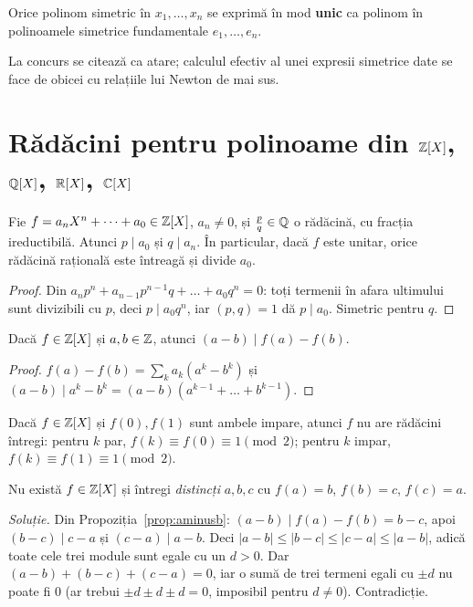 \begin{teorema}\label{teo:polsim}
Orice polinom simetric în $x_1,\dots,x_n$ se exprimă în mod \textbf{unic} ca polinom în polinoamele simetrice fundamentale $e_1,\dots,e_n$.
\end{teorema}

La concurs se citează ca atare; calculul efectiv al unei expresii simetrice date se face de obicei cu relațiile lui Newton de mai sus.

\section{Rădăcini pentru polinoame din $\mathbb{Z}[X]$, $\mathbb{Q}[X]$, $\mathbb{R}[X]$, $\mathbb{C}[X]$}

\begin{teorema}\label{teo:rationale}
Fie $f=a_nX^n+\dots+a_0\in\mathbb{Z}[X]$, $a_n\neq 0$, și $\frac pq\in\mathbb{Q}$ o rădăcină, cu fracția ireductibilă. Atunci $p\mid a_0$ și $q\mid a_n$. În particular, dacă $f$ este unitar, orice rădăcină rațională este întreagă și divide $a_0$.
\end{teorema}

\begin{proof}
Din $a_np^n+a_{n-1}p^{n-1}q+\dots+a_0q^n=0$: toți termenii în afara ultimului sunt divizibili cu $p$, deci $p\mid a_0q^n$, iar $(p,q)=1$ dă $p\mid a_0$. Simetric pentru $q$.
\end{proof}

\begin{propozitie}\label{prop:aminusb}
Dacă $f\in\mathbb{Z}[X]$ și $a,b\in\mathbb{Z}$, atunci $(a-b)\mid f(a)-f(b)$.
\end{propozitie}

\begin{proof}
$f(a)-f(b)=\sum_k a_k(a^k-b^k)$ și $(a-b)\mid a^k-b^k=(a-b)(a^{k-1}+\dots+b^{k-1})$.
\end{proof}

\begin{observatie}
Dacă $f\in\mathbb{Z}[X]$ și $f(0),f(1)$ sunt ambele impare, atunci $f$ nu are rădăcini întregi: pentru $k$ par, $f(k)\equiv f(0)\equiv1\pmod2$; pentru $k$ impar, $f(k)\equiv f(1)\equiv1\pmod 2$.
\end{observatie}

\begin{aplicatie}\label{apl:ciclu}
Nu există $f\in\mathbb{Z}[X]$ și întregi \emph{distincți} $a,b,c$ cu $f(a)=b$, $f(b)=c$, $f(c)=a$.

\emph{Soluție.} Din Propoziția~\ref{prop:aminusb}: $(a-b)\mid f(a)-f(b)=b-c$, apoi $(b-c)\mid c-a$ și $(c-a)\mid a-b$. Deci $|a-b|\le|b-c|\le|c-a|\le|a-b|$, adică toate cele trei module sunt egale cu un $d>0$. Dar $(a-b)+(b-c)+(c-a)=0$, iar o sumă de trei termeni egali cu $\pm d$ nu poate fi $0$ (ar trebui $\pm d\pm d\pm d=0$, imposibil pentru $d\neq0$). Contradicție.
\end{aplicatie}

